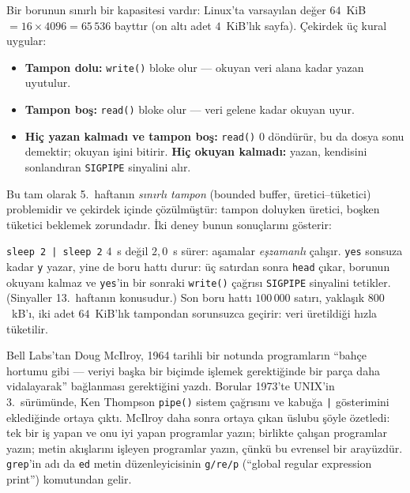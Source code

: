 \documentclass[11pt,a4paper]{article}
\newcommand{\cmd}[1]{\texttt{#1}}
\begin{document}
Bir borunun sınırlı bir kapasitesi vardır: Linux'ta varsayılan değer $64$~KiB $= 16 \times 4096 = 65\,536$ bayttır (on altı adet $4$~KiB'lık sayfa). Çekirdek üç kural uygular:
\begin{itemize}
  \item \textbf{Tampon dolu:} \cmd{write()} bloke olur --- okuyan veri alana kadar yazan uyutulur.
  \item \textbf{Tampon boş:} \cmd{read()} bloke olur --- veri gelene kadar okuyan uyur.
  \item \textbf{Hiç yazan kalmadı ve tampon boş:} \cmd{read()} $0$ döndürür, bu da dosya sonu demektir; okuyan işini bitirir. \textbf{Hiç okuyan kalmadı:} yazan, kendisini sonlandıran \texttt{SIGPIPE} sinyalini alır.
\end{itemize}
Bu tam olarak 5.~haftanın \emph{sınırlı tampon} (bounded buffer, üretici--tüketici) problemidir ve çekirdek içinde çözülmüştür: tampon doluyken üretici, boşken tüketici beklemek zorundadır. İki deney bunun sonuçlarını gösterir:



\cmd{sleep 2 | sleep 2} $4$~s değil $2{,}0$~s sürer: aşamalar \emph{eşzamanlı} çalışır. \cmd{yes} sonsuza kadar \texttt{y} yazar, yine de boru hattı durur: üç satırdan sonra \cmd{head} çıkar, borunun okuyanı kalmaz ve \cmd{yes}'in bir sonraki \cmd{write()} çağrısı \texttt{SIGPIPE} sinyalini tetikler. (Sinyaller 13.~haftanın konusudur.) Son boru hattı $100\,000$ satırı, yaklaşık $800$~kB'ı, iki adet $64$~KiB'lık tampondan sorunsuzca geçirir: veri üretildiği hızla tüketilir.

\begin{histnote}
Bell Labs'tan Doug McIlroy, 1964 tarihli bir notunda programların ``bahçe hortumu gibi --- veriyi başka bir biçimde işlemek gerektiğinde bir parça daha vidalayarak'' bağlanması gerektiğini yazdı. Borular 1973'te UNIX'in 3.~sürümünde, Ken Thompson \cmd{pipe()} sistem çağrısını ve kabuğa \texttt{|} gösterimini eklediğinde ortaya çıktı. McIlroy daha sonra ortaya çıkan üslubu şöyle özetledi: tek bir iş yapan ve onu iyi yapan programlar yazın; birlikte çalışan programlar yazın; metin akışlarını işleyen programlar yazın, çünkü bu evrensel bir arayüzdür. \cmd{grep}'in adı da \cmd{ed} metin düzenleyicisinin \texttt{g/re/p} (``global regular expression print'') komutundan gelir.
\end{histnote}

\end{document}
